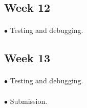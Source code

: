 \documentclass[paper=a4, fontsize=11pt]{scrartcl} %
\begin{document}
\subsection{Week 12}
\paragraph{}$\bullet$ Testing and debugging.
\subsection{Week 13}
\paragraph{}$\bullet$ Testing and debugging.
\paragraph{}$\bullet$ Submission.
\end{document}
